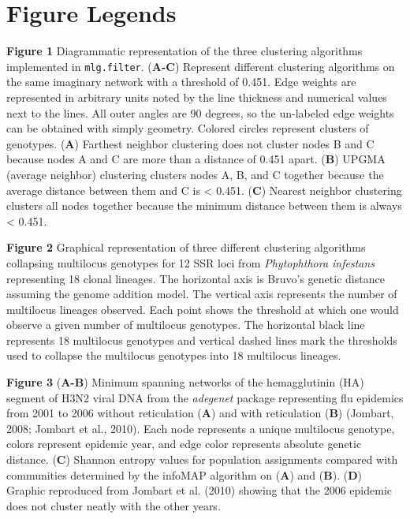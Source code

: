 \documentclass{frontiersSCNS} %
\begin{document}
\section*{Figure Legends}\label{figure-legends}

\textbf{Figure 1} Diagrammatic representation of the three clustering
algorithms implemented in \texttt{mlg.filter}. (\textbf{A-C}) Represent
different clustering algorithms on the same imaginary network with a
threshold of 0.451. Edge weights are represented in arbitrary units
noted by the line thickness and numerical values next to the lines. All
outer angles are 90 degrees, so the un-labeled edge weights can be
obtained with simply geometry. Colored circles represent clusters of
genotypes. (\textbf{A}) Farthest neighbor clustering does not cluster
nodes B and C because nodes A and C are more than a distance of 0.451
apart. (\textbf{B}) UPGMA (average neighbor) clustering clusters nodes
A, B, and C together because the average distance between them and C is
\textless{} 0.451. (\textbf{C}) Nearest neighbor clustering clusters all
nodes together because the minimum distance between them is always
\textless{} 0.451.

\textbf{Figure 2} Graphical representation of three different clustering
algorithms collapsing multilocus genotypes for 12 SSR loci from
\emph{Phytophthora infestans} representing 18 clonal lineages. The
horizontal axis is Bruvo's genetic distance assuming the genome addition
model. The vertical axis represents the number of multilocus lineages
observed. Each point shows the threshold at which one would observe a
given number of multilocus genotypes. The horizontal black line
represents 18 multilocus genotypes and vertical dashed lines mark the
thresholds used to collapse the multilocus genotypes into 18 multilocus
lineages.

\textbf{Figure 3} (\textbf{A-B}) Minimum spanning networks of the
hemagglutinin (HA) segment of H3N2 viral DNA from the \emph{adegenet}
package representing flu epidemics from 2001 to 2006 without
reticulation (\textbf{A}) and with reticulation (\textbf{B}) (Jombart,
2008; Jombart et al., 2010). Each node represents a unique multilocus
genotype, colors represent epidemic year, and edge color represents
absolute genetic distance. (\textbf{C}) Shannon entropy values for
population assignments compared with communities determined by the
infoMAP algorithm on (\textbf{A}) and (\textbf{B}). (\textbf{D}) Graphic
reproduced from Jombart et al. (2010) showing that the 2006 epidemic
does not cluster neatly with the other years.
\end{document}
